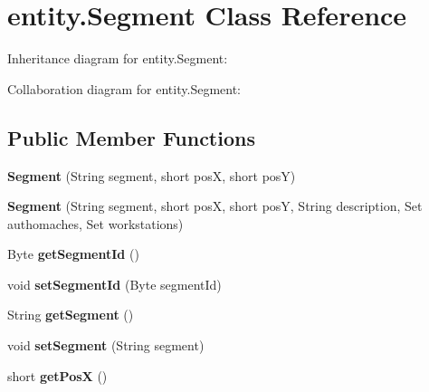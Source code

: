 \hypertarget{classentity_1_1_segment}{}\section{entity.\+Segment Class Reference}
\label{classentity_1_1_segment}


Inheritance diagram for entity.\+Segment\+:


Collaboration diagram for entity.\+Segment\+:
\subsection*{Public Member Functions}
\begin{DoxyCompactItemize}
\item 
\mbox{\label{classentity_1_1_segment_a4198d8bf80daca7aec679e294b962f28}} 
{\bfseries Segment} (String segment, short posX, short posY)
\item 
\mbox{\label{classentity_1_1_segment_a7d23189c239956e9a6580bab38b4dab1}} 
{\bfseries Segment} (String segment, short posX, short posY, String description, Set authomaches, Set workstations)
\item 
\mbox{\label{classentity_1_1_segment_af6727931a43831dcb6a65f00086f150b}} 
Byte {\bfseries get\+Segment\+Id} ()
\item 
\mbox{\label{classentity_1_1_segment_a49190cea3afa331fe0c5fbc10e6214ec}} 
void {\bfseries set\+Segment\+Id} (Byte segment\+Id)
\item 
\mbox{\label{classentity_1_1_segment_af96f1caaaaf411990b64270c830c3456}} 
String {\bfseries get\+Segment} ()
\item 
\mbox{\label{classentity_1_1_segment_abb149147dc902ee032e3bff790010cec}} 
void {\bfseries set\+Segment} (String segment)
\item 
\mbox{\label{classentity_1_1_segment_a0c740639c2fb9fc93add3e63adb4879a}} 
short {\bfseries get\+PosX} ()
\item 
\mbox{\label{classentity_1_1_segment_a8a0c1e5d9ccefcefe2fd5d28ff5703dd}} 

\end{DoxyCompactItemize}
